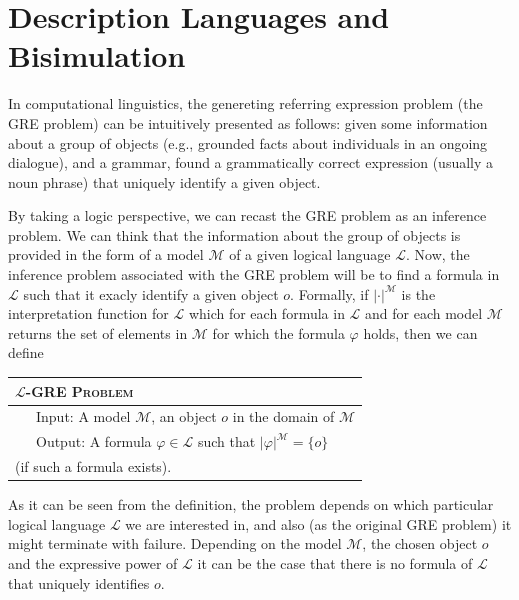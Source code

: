 \newcommand{\gM}{\mathcal{M}}
\newcommand{\gL}{\mathcal{L}}


\section{Description Languages and Bisimulation} \label{sec:bisim}

In computational linguistics, the genereting referring expression problem (the GRE
problem) can be intuitively presented as follows: given some information about
a group of objects (e.g., grounded facts about individuals in an ongoing dialogue),
and a grammar, found a grammatically correct expression (usually a noun phrase) that uniquely identify a given object.

By taking a logic perspective, we can recast the GRE problem as an inference problem.
We can think that the information about the group of objects is provided in the form
of a model $\gM$ of a given logical language $\gL$.  Now, the inference problem
associated with the GRE problem will be to find a formula in $\gL$ such that it
exacly identify a given object $o$.  Formally, if $|\cdot|^\gM$ is the interpretation
function for $\gL$ which for each formula in $\gL$ and for each model $\gM$ returns
the set of elements in $\gM$ for which the formula $\varphi$ holds, then we can define
\medskip

\noindent
{\small
\begin{tabular}{l} \hline
\textsc{$\gL$-GRE Problem}\\ \hline
\ \ \ Input: A model $\gM$, an object $o$ in the domain of $\gM$\\
\ \ \ Output: A formula $\varphi \in \gL$ such that $|\varphi|^\gM = \{o\}$\\
\hspace*{1.4cm} (if such a formula exists).\\ \hline
\end{tabular}}
\medskip

As it can be seen from the definition, the problem depends on which particular
logical language $\gL$ we are interested in, and also (as the original GRE problem)
it might terminate with failure.  Depending on the model $\gM$, the chosen object $o$
and the expressive power of $\gL$ it can be the case that there is no formula of
$\gL$ that uniquely identifies $o$.

